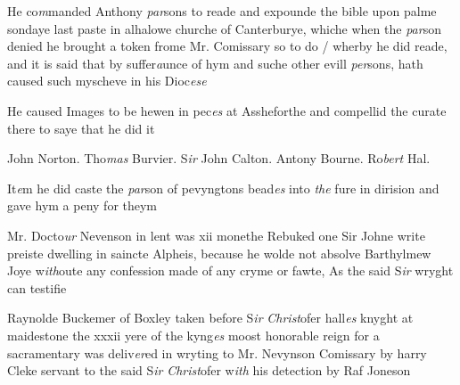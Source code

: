 \documentclass[12pt, a4paper]{book}
\begin{document}
		
				\marginpar[\vspace{0.5cm}{\textcolor{Gray}{n}}]{}
			
		
		\ifthenelse{\isodd{\thepage}}
		{\reversemarginpar}
		{\normalmarginpar}
		He co\textit{m}manded Anthony \textit{par}sons to reade and expounde
 the bible upon palme sondaye last paste in alhalowe
 	churche of Canterburye, whiche when the \textit{par}son denied
			he brought a token frome Mr. Comissary so to do /
 wherby he did reade, and it is said that by suffer\textit{a}unce
 of hym and suche other evill \textit{per}sons, hath caused such
 myscheve in his Dioc\textit{ese}
	

	
			
	
		\ifthenelse{\isodd{\thepage}}
		{\reversemarginpar}
		{\normalmarginpar}
		He caused Images to be hewen in pec\textit{es} at Assheforthe
 and compellid the curate there to saye that he did it

	
		\ifthenelse{\isodd{\thepage}}
		{\reversemarginpar}
		{\normalmarginpar}
		John Norton. Tho\textit{mas} Burvier. S\textit{ir} John Calton. Antony Bourne. Ro\textit{bert} Hal.
			

		\ifthenelse{\isodd{\thepage}}
		{\reversemarginpar}
		{\normalmarginpar}
		It\textit{e}m he did caste the \textit{par}son of pevyngtons bead\textit{es} into \textit{the}
 fure in dirision and gave hym a peny for theym
	
		
				\marginpar[\vspace{0.5cm}{\textcolor{Gray}{Confession}}]{}
			
		
		\ifthenelse{\isodd{\thepage}}
		{\reversemarginpar}
		{\normalmarginpar}
		Mr. Docto\textit{ur} Nevenson in lent was xii monethe
			Rebuked one Sir Johne write preiste dwelling
 in saincte Alpheis, because he wolde not absolve
			Barthylmew Joye w\textit{ith}oute any confession made
			of any cryme or fawte, As the said S\textit{ir} wryght
		can testifie
	
 
				\marginpar[\vspace{0.5cm}{\textcolor{Gray}{n}}]{}
			
 	
		\ifthenelse{\isodd{\thepage}}
		{\reversemarginpar}
		{\normalmarginpar}
		Raynolde Buckemer of Boxley taken before S\textit{ir}
                  \textit{Christ}ofer hall\textit{es} knyght at maidestone the xxxii
 yere of the kyng\textit{es} moost honorable reign for a
 		sacramentary was deliv\textit{er}ed in wryting to Mr.
 Nevynson Comissary by harry Cleke servant to
 		the said S\textit{ir}\textit{ Christ}ofer w\textit{ith} his detection by Raf Joneson
\end{document}
